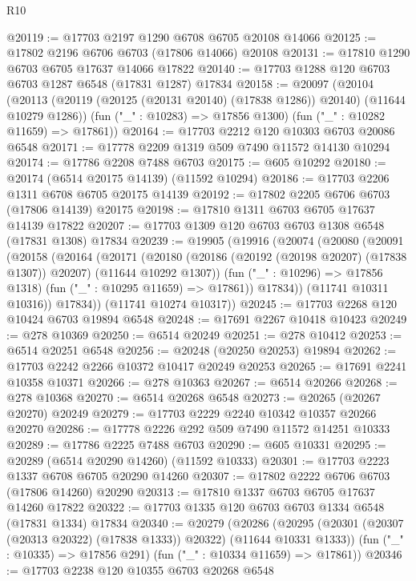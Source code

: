 \begin{lexlean}{R10}
\begin{coremodule}
{{{{{{{{{{{{{{{{{{{{{{{{{{{{{{{{{{{{{{{{{{{{{{{{{{{{{{{{{{{{{{{{{{{{{{{{{{{{{{{{{{{{@20119 := @17703 @2197 @1290 @6708 @6705 @20108 @14066
@20125 := @17802 @2196 @6706 @6703 (@17806 @14066) @20108
@20131 := @17810 @1290 @6703 @6705 @17637 @14066 @17822
@20140 := @17703 @1288 @120 @6703 @6703 @1287 @6548 (@17831 @1287) @17834
@20158 := @20097
    (@20104
      (@20113 (@20119 (@20125 (@20131 @20140) (@17838 @1286)) @20140) (@11644 @10279 @1286))
      (fun ("_" : @10283) => @17856 @1300)
      (fun ("_" : @10282 @11659) => @17861))
@20164 := @17703 @2212 @120 @10303 @6703 @20086 @6548
@20171 := @17778 @2209 @1319 @509 @7490 @11572 @14130 @10294
@20174 := @17786 @2208 @7488 @6703
@20175 := @605 @10292
@20180 := @20174 (@6514 @20175 @14139) (@11592 @10294)
@20186 := @17703 @2206 @1311 @6708 @6705 @20175 @14139
@20192 := @17802 @2205 @6706 @6703 (@17806 @14139) @20175
@20198 := @17810 @1311 @6703 @6705 @17637 @14139 @17822
@20207 := @17703 @1309 @120 @6703 @6703 @1308 @6548 (@17831 @1308) @17834
@20239 := @19905
    (@19916
      (@20074
        (@20080
          (@20091
            (@20158
              (@20164
                (@20171
                  (@20180
                    (@20186 (@20192 (@20198 @20207) (@17838 @1307)) @20207)
                    (@11644 @10292 @1307))
                  (fun ("_" : @10296) => @17856 @1318)
                  (fun ("_" : @10295 @11659) => @17861))
                @17834))
            (@11741 @10311 @10316))
          @17834))
      (@11741 @10274 @10317))
@20245 := @17703 @2268 @120 @10424 @6703 @19894 @6548
@20248 := @17691 @2267 @10418 @10423
@20249 := @278 @10369
@20250 := @6514 @20249
@20251 := @278 @10412
@20253 := @6514 @20251 @6548
@20256 := @20248 (@20250 @20253) @19894
@20262 := @17703 @2242 @2266 @10372 @10417 @20249 @20253
@20265 := @17691 @2241 @10358 @10371
@20266 := @278 @10363
@20267 := @6514 @20266
@20268 := @278 @10368
@20270 := @6514 @20268 @6548
@20273 := @20265 (@20267 @20270) @20249
@20279 := @17703 @2229 @2240 @10342 @10357 @20266 @20270
@20286 := @17778 @2226 @292 @509 @7490 @11572 @14251 @10333
@20289 := @17786 @2225 @7488 @6703
@20290 := @605 @10331
@20295 := @20289 (@6514 @20290 @14260) (@11592 @10333)
@20301 := @17703 @2223 @1337 @6708 @6705 @20290 @14260
@20307 := @17802 @2222 @6706 @6703 (@17806 @14260) @20290
@20313 := @17810 @1337 @6703 @6705 @17637 @14260 @17822
@20322 := @17703 @1335 @120 @6703 @6703 @1334 @6548 (@17831 @1334) @17834
@20340 := @20279
    (@20286
      (@20295 (@20301 (@20307 (@20313 @20322) (@17838 @1333)) @20322) (@11644 @10331 @1333))
      (fun ("_" : @10335) => @17856 @291)
      (fun ("_" : @10334 @11659) => @17861))
@20346 := @17703 @2238 @120 @10355 @6703 @20268 @6548
}}}}}}}}}}}}}}}}}}}}}}}}}}}}}}}}}}}}}}}}}}}}}}}}}}}}}}}}}}}}}}}}}}}}}}}}}}}}}}}}}}}}
\end{coremodule}
\end{lexlean}
